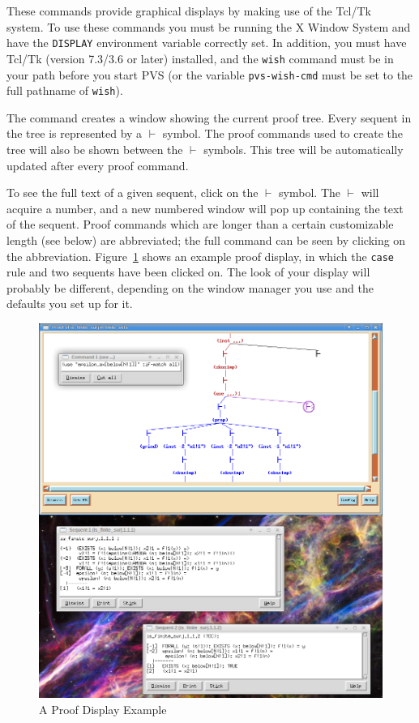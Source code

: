 These commands provide graphical displays by making use of the
Tcl/Tk~\cite{Tcl/TK} system.  To use these commands you must be running
the X Window System and have the
\texttt{DISPLAY} environment variable correctly set.
In addition, you must have Tcl/Tk (version 7.3/3.6 or later)
installed, and the \texttt{wish} command must be in your path before you
start PVS (or the variable \texttt{pvs-wish-cmd} must be set to the full
pathname of \texttt{wish}).  

The  command creates a window showing the
cur\-rent proof tree.  Every sequent in the tree is represented by a
$\vdash$ symbol.  The proof commands used to create
the tree will also be shown between the $\vdash$ symbols.  This tree will
be automatically updated after every proof command.

To see the full text of a given sequent, click on the $\vdash$ symbol.
The $\vdash$ will acquire a number, and a new numbered window will pop up
containing the text of the sequent.  Proof commands which are longer than
a certain customizable length (see below) are abbreviated; the full
command can be seen by clicking on the abbreviation.
Figure~\ref{proofwindow} shows an example proof display, in which the
\texttt{case} rule and two sequents have been clicked on.  The look of
your display will probably be different, depending on the window manager
you use and the defaults you set up for it.

\begin{figure}
\includegraphics[width=\textwidth]{proofwindows.png}  
\caption{A Proof Display Example}\label{proofwindow}
\end{figure}

